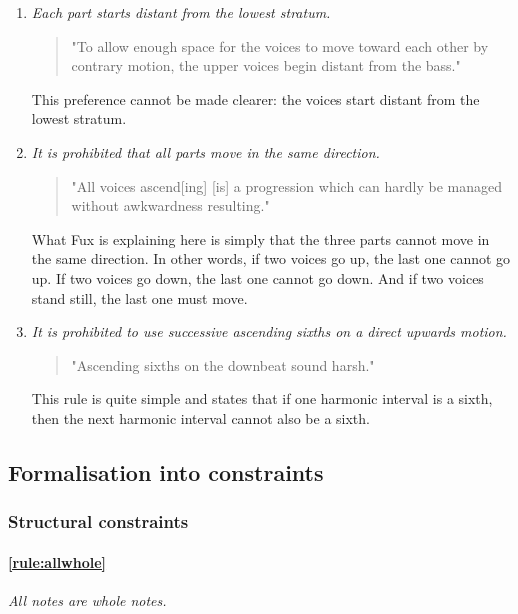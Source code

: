 \begin{enumerate}[wide, label=\bfseries 1.P\arabic*]
    \item\label{rule:start-distant}  \textit{Each part starts distant from the lowest stratum.}

    \begin{quotation}
    "To allow enough space for the voices to move toward each other by contrary motion, the upper voices begin distant from the bass."
    \textcite[p.75]{GaPEng}
    \end{quotation}

    This preference cannot be made clearer: the voices start distant from the lowest stratum.

    \item\label{rule:same-movement}  \textit{It is prohibited that all parts move in the same direction.}

    \begin{quotation}
    "All voices ascend[ing] [is] a progression which can hardly be managed without awkwardness resulting."
    \textcite[p.76]{GaPEng}
    \end{quotation}

    What Fux is explaining here is simply that the three parts cannot move in the same direction. In other words, if two voices go up, the last one cannot go up. If two voices go down, the last one cannot go down. And if two voices stand still, the last one must move.

    \item\label{rule:ascending-sixths}  \textit{It is prohibited to use successive ascending sixths on a direct upwards motion.}

    \begin{quotation}
    "Ascending sixths on the downbeat sound harsh."
    \textcite[p.77]{GaPEng}
    \end{quotation}

    This rule is quite simple and states that if one harmonic interval is a sixth, then the next harmonic interval cannot also be a sixth.
\end{enumerate}

\subsection{Formalisation into constraints}
\subsubsection{Structural constraints}
    \paragraph{\hspace{0.6cm}\ref{rule:allwhole}} \textit{All notes are whole notes.}
    
